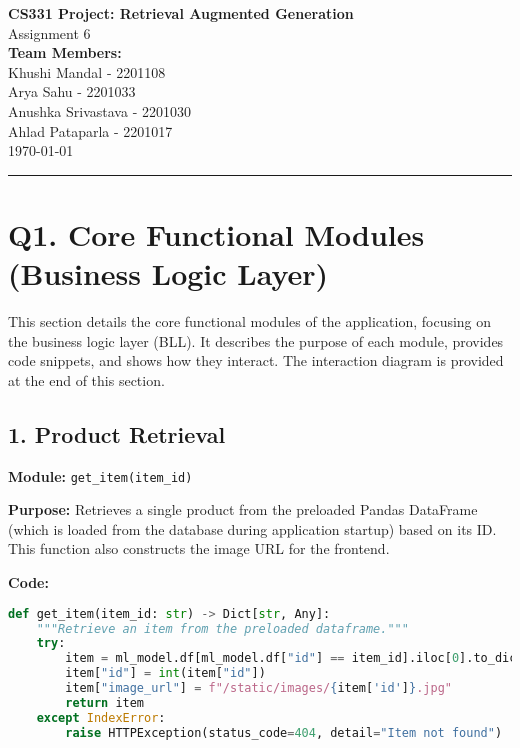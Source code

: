 \documentclass[12pt,a4paper]{article}
\begin{document}
\begin{center}
    \Large \textbf{CS331 Project: Retrieval Augmented Generation} \\
    \large Assignment 6 \\
    \vspace{0.5cm}
    \textbf{Team Members:} \\
    Khushi Mandal - 2201108 \\
    Arya Sahu - 2201033 \\
    Anushka Srivastava - 2201030 \\
    Ahlad Pataparla - 2201017 \\
    \vspace{1cm}
    \today \\
    \rule{\textwidth}{0.4pt}
\end{center}

\section*{Q1.  Core Functional Modules (Business Logic Layer)}

\noindent This section details the core functional modules of the application, focusing on the business logic layer (BLL).  It describes the purpose of each module, provides code snippets, and shows how they interact.  The interaction diagram is provided at the end of this section.

\subsection*{1. Product Retrieval}
\textbf{Module:} \texttt{get\_item(item\_id)}

\textbf{Purpose:} Retrieves a single product from the preloaded Pandas DataFrame (which is loaded from the database during application startup) based on its ID.  This function also constructs the image URL for the frontend.

\textbf{Code:}
\begin{lstlisting}[language=Python]
def get_item(item_id: str) -> Dict[str, Any]:
    """Retrieve an item from the preloaded dataframe."""
    try:
        item = ml_model.df[ml_model.df["id"] == item_id].iloc[0].to_dict()
        item["id"] = int(item["id"])
        item["image_url"] = f"/static/images/{item['id']}.jpg"
        return item
    except IndexError:
        raise HTTPException(status_code=404, detail="Item not found")
\end{lstlisting}
\end{document}
